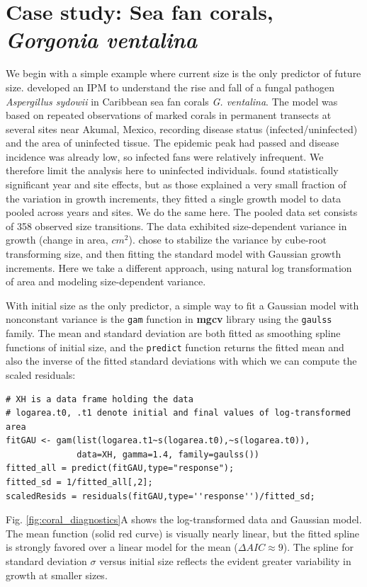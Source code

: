 \documentclass[12pt]{article}
\begin{document}
\section{Case study: Sea fan corals, \emph{Gorgonia ventalina}}
We begin with a simple example where current size is the only predictor of future size. 
\cite{bruno-etal-2011} developed an IPM to understand the rise and fall of a fungal pathogen \emph{Aspergillus sydowii} in Caribbean sea fan corals \emph{G. ventalina}. 
The model was based on repeated observations of marked corals in permanent transects at several sites near Akumal, Mexico, recording disease status (infected/uninfected) and the area of uninfected tissue. 
The epidemic peak had passed and disease incidence was already low, so infected fans were relatively infrequent. 
We therefore limit the analysis here to uninfected individuals.
\citet{bruno-etal-2011} found statistically significant year and site effects, but as those explained a very small fraction of the variation in growth increments, they fitted a single growth model to data pooled across years and sites. 
We do the same here. 
The pooled data set consists of 358 observed size transitions. 
The data exhibited size-dependent variance in growth (change in area, $cm^2$).  
\cite{bruno-etal-2011} chose to stabilize the variance by cube-root transforming size, and then fitting the standard model with Gaussian growth increments. 
Here we take a different approach, using natural log transformation of area and modeling size-dependent variance. 

With initial size as the only predictor, a simple way to fit a Gaussian model with nonconstant variance is the \texttt{gam} function in \textbf{mgcv} library \citep{wood-2017} using the \texttt{gaulss} family. 
The mean and standard deviation are both fitted as smoothing spline functions of initial size, and the \texttt{predict} function returns the fitted mean and also the inverse of the fitted standard deviations with which we can compute the scaled residuals: 
\begin{lstlisting}
# XH is a data frame holding the data
# logarea.t0, .t1 denote initial and final values of log-transformed area   
fitGAU <- gam(list(logarea.t1~s(logarea.t0),~s(logarea.t0)),
              data=XH, gamma=1.4, family=gaulss())
fitted_all = predict(fitGAU,type="response"); 
fitted_sd = 1/fitted_all[,2]; 
scaledResids = residuals(fitGAU,type=''response'')/fitted_sd;  
\end{lstlisting}
Fig. \ref{fig:coral_diagnostics}A shows the log-transformed data and Gaussian model. 
The mean function (solid red curve) is visually nearly linear, but the fitted spline is strongly favored over a linear model for the mean ($\Delta AIC \approx 9$). 
The spline for standard deviation $\sigma$ versus initial size reflects the evident greater variability in growth at smaller sizes.  
\end{document}

